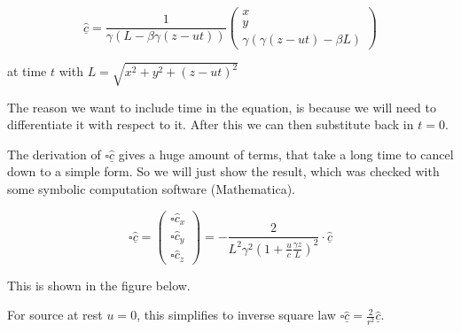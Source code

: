 \begin{equation}
	\underline{\hat{c}} = \frac{1}{ \gamma \left( L - \beta \gamma (z-ut) \right) }
	\begin{pmatrix}
		x \\
		y \\
		\gamma \left(\gamma (z-ut) - \beta L \right)
	\end{pmatrix}
\end{equation}

at time $t$ with $L=\sqrt{x^2 + y^2 + (z-ut)^2}$

The reason we want to include time in the equation, is because we will need to differentiate it with respect to it.
After this we can then substitute back in $t=0$.

The derivation of $\square\underline{\hat{c}}$ gives a huge amount of terms, that take a long time to cancel down to a simple form.
So we will just show the result, which was checked with some symbolic computation software (Mathematica).

\begin{equation}
	\square \underline{\hat{c}} =
	\begin{pmatrix}
		\square \hat{c}_x \\
		\square \hat{c}_y \\
		\square \hat{c}_z
	\end{pmatrix}
	=
	- \frac{2}{L^2\gamma^2\left( 1 + \frac{u}{c} \frac{\gamma z}{L} \right)^2} \cdot \underline{\hat{c}}
\end{equation}

This is shown in the figure below.

For source at rest $u=0$, this simplifies to inverse square law $\square \underline{\hat{c}} =\frac{2}{r^2}\underline{\hat{c}}$.

